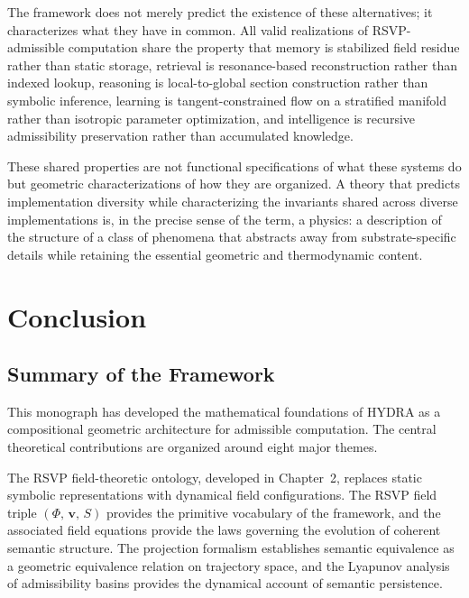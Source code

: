 \documentclass[12pt, a4paper, openany]{book}
\theoremstyle{plain}
\theoremstyle{definition}
\theoremstyle{remark}
\newcommand{\vvec}{\mathbf{v}}
\newcommand{\Sfield}{S}
\newcommand{\RSVPtriple}{(\Phi,\,\vvec,\,\Sfield)}
\begin{document}
The framework does not merely predict the existence of these alternatives; it characterizes what they have in common. All valid realizations of RSVP-admissible computation share the property that memory is stabilized field residue rather than static storage, retrieval is resonance-based reconstruction rather than indexed lookup, reasoning is local-to-global section construction rather than symbolic inference, learning is tangent-constrained flow on a stratified manifold rather than isotropic parameter optimization, and intelligence is recursive admissibility preservation rather than accumulated knowledge.

These shared properties are not functional specifications of what these systems do but geometric characterizations of how they are organized. A theory that predicts implementation diversity while characterizing the invariants shared across diverse implementations is, in the precise sense of the term, a physics: a description of the structure of a class of phenomena that abstracts away from substrate-specific details while retaining the essential geometric and thermodynamic content.

\chapter{Conclusion}

\section{Summary of the Framework}

This monograph has developed the mathematical foundations of HYDRA as a compositional geometric architecture for admissible computation. The central theoretical contributions are organized around eight major themes.

The RSVP field-theoretic ontology, developed in Chapter~2, replaces static symbolic representations with dynamical field configurations. The RSVP field triple $\RSVPtriple$ provides the primitive vocabulary of the framework, and the associated field equations provide the laws governing the evolution of coherent semantic structure. The projection formalism establishes semantic equivalence as a geometric equivalence relation on trajectory space, and the Lyapunov analysis of admissibility basins provides the dynamical account of semantic persistence.
\end{document}
